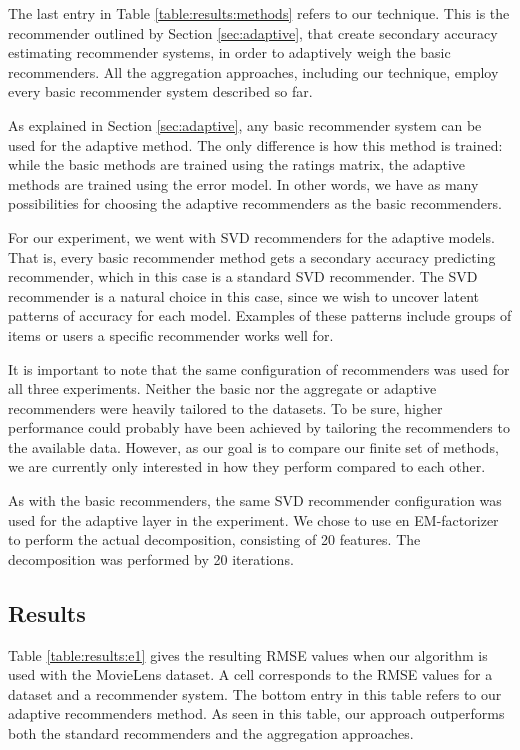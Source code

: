 The last entry in Table \ref{table:results:methods}
refers to our technique. 
This is the recommender outlined by Section \ref{sec:adaptive},
that create secondary accuracy estimating recommender systems,
in order to adaptively weigh the basic recommenders.
All the aggregation approaches, including our technique,
employ every basic recommender system described so far.

As explained in Section \ref{sec:adaptive},
any basic recommender system can be used for the adaptive method.
The only difference is how this method is trained:
while the basic methods are trained using the ratings matrix,
the adaptive methods are trained using the error model.
In other words, we have as many possibilities for choosing
the adaptive recommenders as the basic recommenders.

For our experiment, we went with SVD recommenders
for the adaptive models.
That is, every basic recommender method gets a secondary 
accuracy predicting recommender, which in this case is a 
standard SVD recommender.
The SVD recommender is a natural choice in this case,
since we wish to uncover latent patterns of accuracy
for each model.
Examples of these patterns include groups of items
or users a specific recommender works well for.

It is important to note that the same configuration of recommenders was used for all three experiments.
Neither the basic nor the aggregate or adaptive recommenders were heavily tailored
to the datasets. To be sure, higher performance could probably have been achieved
by tailoring the recommenders to the available data. 
However, as our goal is to compare our finite set of methods, 
we are currently only interested in how they perform compared to each other.

As with the basic recommenders, the same SVD recommender configuration was used 
for the adaptive layer in the experiment.
We chose to use en EM-factorizer to perform the actual decomposition,
consisting of 20 features. The decomposition was performed by 20 iterations.


\subsection{Results}

Table \ref{table:results:e1} gives the resulting RMSE values when our algorithm is used with the MovieLens dataset.
A cell corresponds to the RMSE values for a dataset and a recommender system.
The bottom entry in this table refers to our adaptive recommenders method.
As seen in this table, our approach outperforms both the standard recommenders
and the aggregation approaches.

